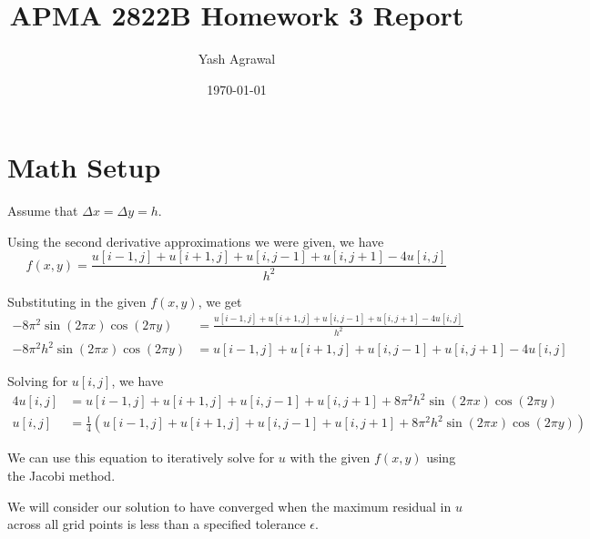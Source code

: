\documentclass[11pt]{article}
\title{APMA 2822B Homework 3 Report}
\author{Yash Agrawal}
\date{\today}
\begin{document}
\maketitle

\section*{Math Setup}
Assume that $\Delta x = \Delta y = h$. 

Using the second derivative approximations we were given, we have
\[
    f(x, y) = \frac{u[i-1, j] + u[i+1, j] + u[i, j-1] + u[i, j+1] - 4u[i, j]}{h^2}
\]

Substituting in the given $f(x, y)$, we get
\begin{align*}
    -8\pi^2 \sin(2\pi x) \cos(2\pi y) &= \frac{u[i-1, j] + u[i+1, j] + u[i, j-1] + u[i, j+1] - 4u[i, j]}{h^2} \\
    -8\pi^2 h^2 \sin(2\pi x) \cos(2\pi y) &= u[i-1, j] + u[i+1, j] + u[i, j-1] + u[i, j+1] - 4u[i, j]
\end{align*}

Solving for $u[i, j]$, we have
\begin{align*}
    4u[i, j] &= u[i-1, j] + u[i+1, j] + u[i, j-1] + u[i, j+1] + 8\pi^2 h^2 \sin(2\pi x) \cos(2\pi y) \\
    u[i, j] &= \frac{1}{4} \left( u[i-1, j] + u[i+1, j] + u[i, j-1] + u[i, j+1] + 8\pi^2 h^2 \sin(2\pi x) \cos(2\pi y) \right)
\end{align*}

We can use this equation to iteratively solve for $u$ with the given $f(x, y)$ using the Jacobi method. 

We will consider our solution to have converged when the maximum residual in $u$ across all grid points is less than a specified tolerance $\epsilon$.
\end{document}
